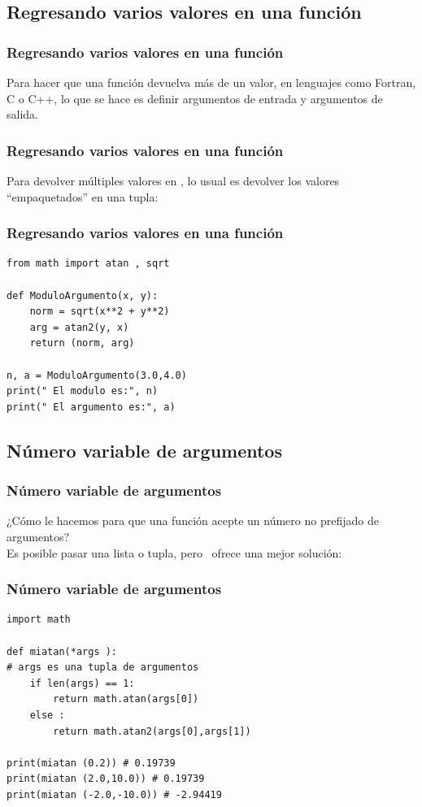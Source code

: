 \subsection{Regresando varios valores en una función}
\begin{frame}[fragile]
\frametitle{Regresando varios valores en una función}
Para hacer que una función devuelva más de un valor, en lenguajes como Fortran, C o C++, lo que se hace es definir argumentos de entrada y argumentos de salida.
\end{frame}
\begin{frame}[fragile]
\frametitle{Regresando varios valores en una función}
Para devolver múltiples valores en \python, lo usual es devolver los valores \enquote{empaquetados} en una tupla:
\end{frame}
\begin{frame}[fragile]
\frametitle{Regresando varios valores en una función}
\begin{lstlisting}[caption=Devolviendo varios valores, basicstyle=\linespread{1.2}\ttfamily\small, columns=fullflexible,escapeinside=||]
from math import atan , sqrt

def ModuloArgumento(x, y):
    norm = sqrt(x**2 + y**2)
    arg = atan2(y, x)
    return (norm, arg)
    
n, a = ModuloArgumento(3.0,4.0)
print(" El modulo es:", n)
print(" El argumento es:", a)
\end{lstlisting}
\end{frame}
\subsection{Número variable de argumentos}
\begin{frame}[fragile]
\frametitle{Número variable de argumentos}
¿Cómo le hacemos para que una función acepte un número no prefijado de argumentos?
\\
\medskip
Es posible pasar una lista o tupla, pero \python\ ofrece una mejor solución:
\end{frame}
\begin{frame}[fragile]
\frametitle{Número variable de argumentos}
\begin{lstlisting}[caption=Uso de *args, basicstyle=\linespread{1.2}\ttfamily\small, columns=fullflexible,escapeinside=||]
import math

def miatan(*args ):
# args es una tupla de argumentos
    if len(args) == 1:
        return math.atan(args[0])
    else :
        return math.atan2(args[0],args[1])

print(miatan (0.2)) # 0.19739
print(miatan (2.0,10.0)) # 0.19739
print(miatan (-2.0,-10.0)) # -2.94419
\end{lstlisting}
\end{frame}

